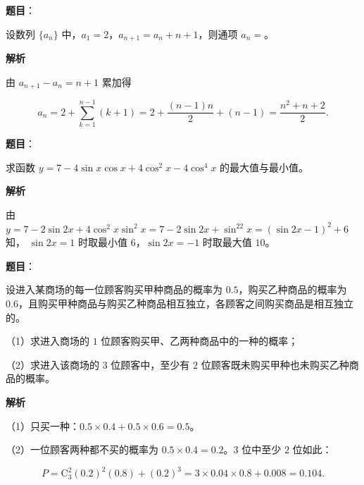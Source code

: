 \begin{answer}

\textbf{题目}：

设数列 $\{a_n\}$ 中，$a_1=2$，$a_{n+1}=a_n+n+1$，则通项 $a_n=$\gkblank{}。

\textbf{解析}

由 $a_{n+1}-a_n=n+1$ 累加得

\nopagebreak[4]
\[a_n=2+\sum_{k=1}^{n-1}(k+1)=2+\frac{(n-1)n}2+(n-1)=\frac{n^2+n+2}2.\]


\end{answer}
\begin{answer}

\textbf{题目}：

求函数 $y=7-4\sin x\cos x+4\cos^2x-4\cos^4x$ 的最大值与最小值。

\textbf{解析}

由 $y=7-2\sin2x+4\cos^2x\sin^2x=7-2\sin2x+\sin^22x=(\sin2x-1)^2+6$ 知， $\sin2x=1$ 时取最小值 $6$，$\sin2x=-1$ 时取最大值 $10$。


\end{answer}
\begin{answer}

\textbf{题目}：

设进入某商场的每一位顾客购买甲种商品的概率为 $0.5$，购买乙种商品的概率为 $0.6$，且购买甲种商品与购买乙种商品相互独立，各顾客之间购买商品是相互独立的。

（1）求进入商场的 $1$ 位顾客购买甲、乙两种商品中的一种的概率；

（2）求进入该商场的 $3$ 位顾客中，至少有 $2$ 位顾客既未购买甲种也未购买乙种商品的概率。

\textbf{解析}

（1）只买一种：$0.5\times0.4+0.5\times0.6=0.5$。

（2）一位顾客两种都不买的概率为 $0.5\times0.4=0.2$。$3$ 位中至少 $2$ 位如此：

\nopagebreak[4]
\[P=\mathrm C_3^2(0.2)^2(0.8)+(0.2)^3=3\times0.04\times0.8+0.008=0.104.\]


\end{answer}
